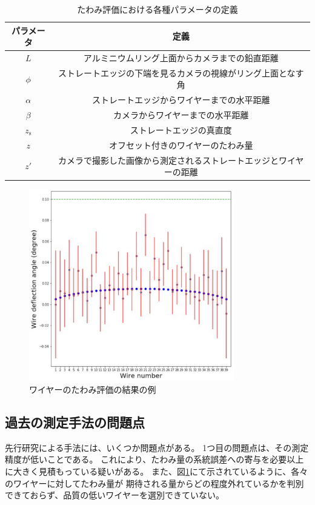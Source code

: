 \documentclass[../../main.tex]{subfiles}
\begin{document}
\begin{table}[H]
    \centering
    \caption{たわみ評価における各種パラメータの定義}
    \begin{tabular}{|c|c|}
        \hline
        パラメータ & 定義 \\
        \hline
        $L$ & アルミニウムリング上面からカメラまでの鉛直距離 \\
        $\phi$ & ストレートエッジの下端を見るカメラの視線がリング上面となす角 \\
        $\alpha$ & ストレートエッジからワイヤーまでの水平距離 \\
        $\beta$ & カメラからワイヤーまでの水平距離 \\
        $z_{\mathrm{s}}$ & ストレートエッジの真直度 \\
        $z$ & オフセット付きのワイヤーのたわみ量 \\
        $z'$ & カメラで撮影した画像から測定されるストレートエッジとワイヤーの距離 \\
        \hline
    \end{tabular}
    \label{tab:wiresag_setup_old}
\end{table}
\begin{figure}[H]
    \centering
    \includegraphics[width=0.8\textwidth]{wiregrid/wiresag_result_old.pdf}
    \caption{ワイヤーのたわみ評価の結果の例\cite{swg:murata}}
    \label{fig:wiresag_result_old}    
\end{figure}

\subsection{過去の測定手法の問題点}
先行研究\cite{swg:murata}\cite{swg:iijima}による手法には、いくつか問題点がある。
1つ目の問題点は、その測定精度が低いことである。
これにより、たわみ量の系統誤差への寄与を必要以上に大きく見積もっている疑いがある。
また、図\ref{fig:wiresag_result_old}にて示されているように、各々のワイヤーに対してたわみ量が
期待される量からどの程度外れているかを判別できておらず、品質の低いワイヤーを選別できていない。
\end{document}
